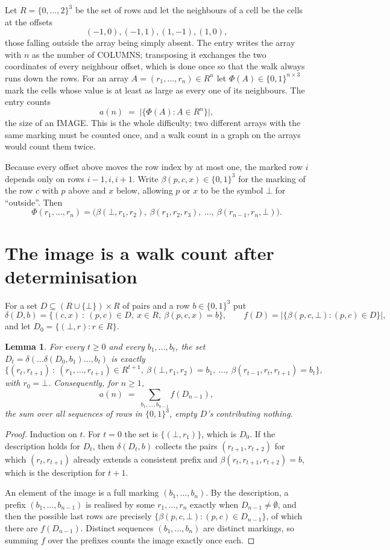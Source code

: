 \documentclass[11pt,a4paper]{article}
\theoremstyle{plain}
\newtheorem{lemma}[theorem]{Lemma}
\theoremstyle{definition}
\begin{document}
Let $R=\{0,\dots,2\}^{3}$ be the set of rows and let the neighbours of a cell be the
cells at the offsets
\[
(-1,0), (-1,1), (1,-1), (1,0),
\]
those falling outside the array being simply absent. The entry writes the array with $n$ as the number of COLUMNS; transposing it exchanges the two coordinates of every neighbour offset, which is done once so that the walk always runs down the rows. For an array
$A=(r_1,\dots,r_n)\in R^n$ let $\Phi(A)\in\{0,1\}^{n\times3}$ mark the cells whose value
is at least as large as every one of its neighbours. The entry counts
\[
a(n)\;=\;\bigl|\{\Phi(A):A\in R^n\}\bigr| ,
\]
the size of an IMAGE. This is the whole difficulty: two different arrays with the same marking
must be counted once, and a walk count in a graph on the arrays would count them twice.

Because every offset above moves the row index by at most one, the marked row $i$ depends only
on rows $i-1,i,i+1$. Write $\beta(p,c,x)\in\{0,1\}^{3}$ for the marking of the row $c$
with $p$ above and $x$ below, allowing $p$ or $x$ to be the symbol $\bot$ for ``outside''.
Then
\[
\Phi(r_1,\dots,r_n)=\bigl(\beta(\bot,r_1,r_2),\ \beta(r_1,r_2,r_3),\ \dots,\
\beta(r_{n-1},r_n,\bot)\bigr).
\]

\section{The image is a walk count after determinisation}

For a set $D\subseteq(R\cup\{\bot\})\times R$ of pairs and a row $b\in\{0,1\}^{3}$ put
\[
\delta(D,b)=\{(c,x)\ :\ (p,c)\in D,\ x\in R,\ \beta(p,c,x)=b\},\qquad
f(D)=\bigl|\{\beta(p,c,\bot):(p,c)\in D\}\bigr| ,
\]
and let $D_0=\{(\bot,r):r\in R\}$.

\begin{lemma}\label{lem:det}
For every $t\ge0$ and every $b_1,\dots,b_t$, the set
$D_t=\delta(\dots\delta(D_0,b_1)\dots,b_t)$ is exactly
\[
\{(r_t,r_{t+1})\ :\ (r_1,\dots,r_{t+1})\in R^{t+1},\ \beta(\bot,r_1,r_2)=b_1,\ \dots,\
\beta(r_{t-1},r_t,r_{t+1})=b_t\} ,
\]
with $r_0=\bot$. Consequently, for $n\ge1$,
\[
a(n)\;=\;\sum_{b_1,\dots,b_{n-1}}f(D_{n-1}),
\]
the sum over all sequences of rows in $\{0,1\}^{3}$, empty $D$'s contributing nothing.
\end{lemma}

\begin{proof}
Induction on $t$. For $t=0$ the set is $\{(\bot,r_1)\}$, which is $D_0$. If the description
holds for $D_t$, then $\delta(D_t,b)$ collects the pairs $(r_{t+1},r_{t+2})$ for which
$(r_t,r_{t+1})$ already extends a consistent prefix and
$\beta(r_t,r_{t+1},r_{t+2})=b$, which is the description for $t+1$.

An element of the image is a full marking $(b_1,\dots,b_n)$. By the description, a prefix
$(b_1,\dots,b_{n-1})$ is realised by some $r_1,\dots,r_n$ exactly when $D_{n-1}\neq
\emptyset$, and then the possible last rows are precisely
$\{\beta(p,c,\bot):(p,c)\in D_{n-1}\}$, of which there are $f(D_{n-1})$. Distinct
sequences $(b_1,\dots,b_n)$ are distinct markings, so summing $f$ over the prefixes counts the
image exactly once each.
\end{proof}
\end{document}

